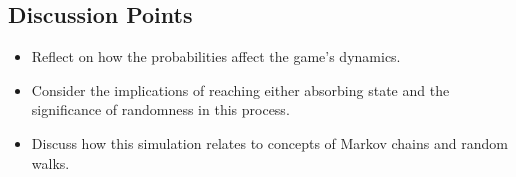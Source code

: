 \documentclass{article}
\begin{document}
\begin{itemize}
\subsection*{Discussion Points}
\begin{itemize}
    \item Reflect on how the probabilities affect the game's dynamics.
    \item Consider the implications of reaching either absorbing state and the significance of randomness in this process.
    \item Discuss how this simulation relates to concepts of Markov chains and random walks.
\end{itemize}


\end{itemize}
\end{document}
